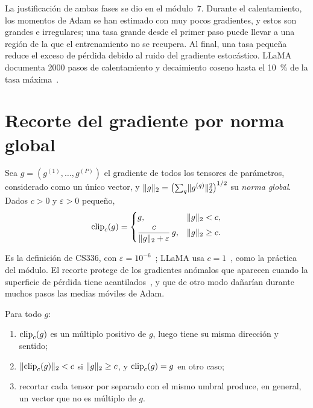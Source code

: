 La justificación de ambas fases se dio en el módulo~7. Durante el calentamiento, los momentos de Adam se han estimado con muy pocos gradientes, y estos son grandes e irregulares; una tasa grande desde el primer paso puede llevar a una región de la que el entrenamiento no se recupera. Al final, una tasa pequeña reduce el exceso de pérdida debido al ruido del gradiente estocástico. LLaMA documenta 2000 pasos de calentamiento y decaimiento coseno hasta el 10~\% de la tasa máxima~\cite[§2.3]{llama}.

\section{Recorte del gradiente por norma global}

\begin{definicion}\label{def:recorte}
Sea $g=(g^{(1)},\dots,g^{(P)})$ el gradiente de todos los tensores de parámetros, considerado como un único vector, y $\lVert g\rVert_2=\bigl(\sum_{q}\lVert g^{(q)}\rVert_2^{2}\bigr)^{1/2}$ su \emph{norma global}. Dados $c>0$ y $\varepsilon>0$ pequeño,
\[
\operatorname{clip}_c(g)=\begin{cases} g, & \lVert g\rVert_2<c,\\[1mm] \dfrac{c}{\lVert g\rVert_2+\varepsilon}\,g, & \lVert g\rVert_2\ge c.\end{cases}
\]
\end{definicion}

Es la definición de CS336, con $\varepsilon=10^{-6}$~\cite[§4.5]{cs336}; LLaMA usa $c=1$~\cite[§2.3]{llama}, como la práctica del módulo. El recorte protege de los gradientes anómalos que aparecen cuando la superficie de pérdida tiene acantilados~\cite[§8.2.4]{gbc}, y que de otro modo dañarían durante muchos pasos las medias móviles de Adam.

\begin{proposicion}\label{prop:recorte}
Para todo $g$:
\begin{enumerate}
  \item $\operatorname{clip}_c(g)$ es un múltiplo positivo de $g$, luego tiene su misma dirección y sentido;
  \item $\lVert\operatorname{clip}_c(g)\rVert_2<c$ si $\lVert g\rVert_2\ge c$, y $\operatorname{clip}_c(g)=g$ en otro caso;
  \item recortar cada tensor por separado con el mismo umbral produce, en general, un vector que no es múltiplo de $g$.
\end{enumerate}
\end{proposicion}

